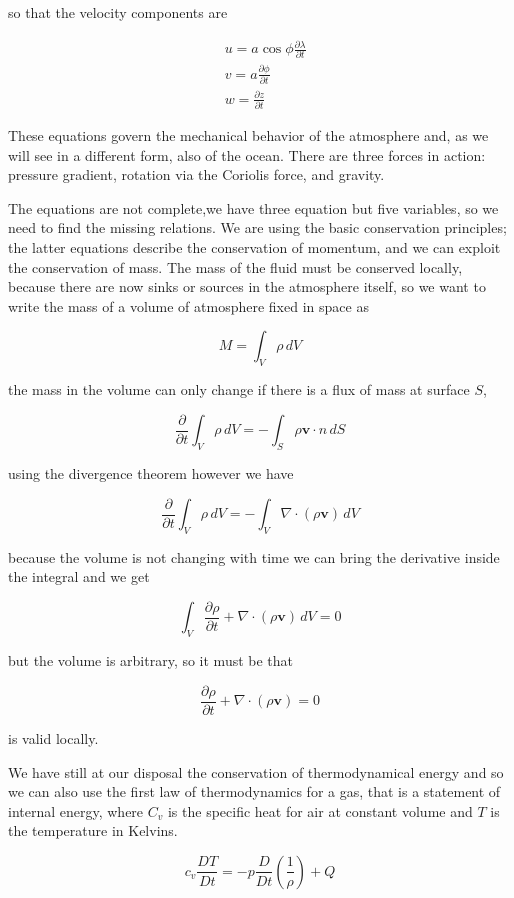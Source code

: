 so that the velocity components are

\[\begin{aligned}
&u = a\cos{\phi\frac{\partial \lambda}{\partial t}}\\
&v = a \frac{\partial \phi}{\partial t}\\
&w = \frac{\partial z}{\partial t}
\end{aligned}\]

These equations govern the mechanical behavior of the atmosphere and, as we will see in a different form, also of the ocean. There are three forces in action: pressure gradient, rotation via the Coriolis force, and gravity.

The equations are not complete,we have three equation but five variables, so we need to find the missing relations. We are using the basic conservation principles; the latter equations describe the conservation
of momentum, and we can exploit the conservation of mass. The mass of the fluid must be conserved locally, because there are now sinks or sources in the atmosphere itself, so we want to write the mass of a volume of
atmosphere fixed in space as

\[M = \int_V  \rho \,dV\]

the mass in the volume can only change if there is a flux of mass at surface \(S\),

\[\frac{\partial }{\partial t} \int_V  \rho \,dV = -\int_S \rho\mathbf{v}\cdot n \, dS\]

using the divergence theorem however we have

\[\frac{\partial }{\partial t} \int_V  \rho \,dV = -\int_V \nabla\cdot(\rho\mathbf{v}) \,dV\]

because the volume is not changing with time we can bring the derivative inside the integral and we get

\[\int_V  \frac{\partial \rho}{\partial t}+\nabla\cdot(\rho\mathbf{v}) \,dV = 0\]

but the volume is arbitrary, so it must be that

\[\frac{\partial \rho}{\partial t}+\nabla\cdot(\rho\mathbf{v}) = 0\]

is valid locally.

We have still at our disposal the conservation of thermodynamical energy and so we can also use the first law of thermodynamics for a gas, that is a statement of internal energy, where $C_v$ is the specific heat for air at constant volume and $T$ is the temperature in Kelvins.

\[c_v\frac{D T}{Dt} = -p\frac{D }{Dt}\left(\frac{1}{\rho}\right)+ Q\]

